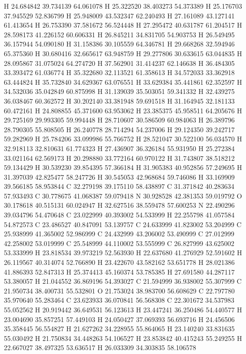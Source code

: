 \documentclass{article}
\begin{document}
H 24.684842 39.734139 64.061078
H 25.322520 38.403273 54.373389
H 25.176703 37.945529 52.836799
H 25.948009 43.532347 62.240493
H 27.161089 43.127141 61.413654
H 26.753390 37.581672 56.524448
H 27.295472 40.631787 61.204517
H 28.598173 41.226152 60.606331
H 26.845211 34.831705 54.903753
H 26.549495 36.157944 54.090180
H 31.158386 30.105559 64.346781
H 29.668268 32.594946 65.375360
H 30.680416 32.665617 63.948759
H 29.277806 30.633615 63.044835
H 28.095867 31.075024 64.274720
H 37.562901 31.414237 62.146638
H 36.484305 33.393472 61.036774
H 35.322680 32.113521 61.358613
H 34.572033 33.362918 63.444824
H 35.732840 34.629367 63.076551
H 33.629384 35.441861 62.352597
H 34.532036 35.042849 60.875998
H 31.139039 35.503051 59.341332
H 32.439275 36.038467 60.362572
H 30.202140 33.381948 59.691518
H 31.164945 32.181133 60.472161
H 24.808855 45.371600 63.953062
H 23.385375 45.958511 64.205676
H 29.725169 29.993305 59.994448
H 28.710607 30.586509 60.984063
H 26.389796 28.790305 55.808505
H 26.240778 28.714294 54.237006
H 29.124350 39.242717 59.282969
H 25.784206 33.099986 55.766752
H 28.521047 30.522100 56.034570
H 32.918113 32.810631 61.774323
H 27.436907 36.326184 55.931950
H 25.272384 33.021164 62.569173
H 20.298880 33.772164 60.970122
H 31.743807 38.518212 59.134429
H 30.539230 39.854395 57.366184
H 31.905383 40.952856 57.249695
H 31.397039 42.825477 58.247726
H 30.545053 42.968684 59.746086
H 33.169909 39.566185 58.953844
C 32.279198 39.175110 58.438897
C 31.371842 40.283634 57.933493
C 30.778675 41.068387 59.079418
N 30.928528 42.381353 59.019792
O 30.178618 40.515131 60.024947
H 32.627516 38.559478 57.600253
N 22.490296 39.034796 54.470648
C 23.022999 40.393002 54.533999
H 22.255798 41.057584 54.872573
C 23.486527 40.847091 53.139757
C 24.633999 41.823002 53.204999
C 25.938999 41.365002 52.986999
C 24.432999 43.206002 53.490999
C 27.012999 42.258002 53.019999
C 25.548999 44.110002 53.555999
C 26.827999 43.625002 53.333999
H 23.818534 39.973219 52.563930
H 22.637680 41.276929 52.591602
H 26.119567 40.314074 52.766890
H 23.422670 43.582162 53.651778
H 28.021386 41.886393 52.847313
H 25.374413 45.160374 53.785385
H 27.691580 44.287117 53.380057
H 21.044552 36.869196 54.393027
C 21.594999 36.938002 55.307999
C 21.950734 38.400731 55.532801
O 21.753024 38.983700 56.608629
C 22.797780 35.970640 55.283464
C 23.623933 36.070841 56.568308
C 22.301672 34.537983 55.052562
H 20.919442 36.649531 56.123613
H 23.447241 36.250486 54.440577
H 23.004690 35.857251 57.449103
H 24.050427 37.069393 56.693716
H 24.456506 35.358445 56.554827
H 21.627262 34.228955 55.864065
H 23.140240 33.831635 55.030492
H 21.750834 34.448263 54.106527
H 23.853842 40.415243 55.249255
H 22.667027 38.497325 53.636517
H 26.033309 34.303835 58.106578
~    
\end{document}
